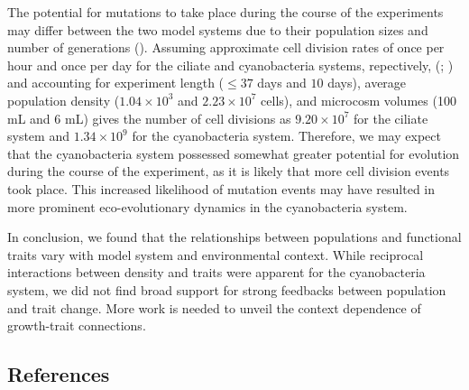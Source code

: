 \documentclass[
  letterpaper,
  DIV=11,
  numbers=noendperiod]{scrartcl}
\begin{document}
The potential for mutations to take place during the course of the
experiments may differ between the two model systems due to their
population sizes and number of generations
(). Assuming
approximate cell division rates of once per hour and once per day for
the ciliate and cyanobacteria systems, repectively,
(;
) and accounting for
experiment length (\(\leq 37\) days and \(10\) days), average population
density (\(1.04 \times 10^{3}\) and \(2.23 \times 10^{7}\) cells), and
microcosm volumes (100 mL and 6 mL) gives the number of cell divisions
as \(9.20 \times 10^{7}\) for the ciliate system and
\(1.34 \times 10^{9}\) for the cyanobacteria system. Therefore, we may
expect that the cyanobacteria system possessed somewhat greater
potential for evolution during the course of the experiment, as it is
likely that more cell division events took place. This increased
likelihood of mutation events may have resulted in more prominent
eco-evolutionary dynamics in the cyanobacteria system.

In conclusion, we found that the relationships between populations and
functional traits vary with model system and environmental context.
While reciprocal interactions between density and traits were apparent
for the cyanobacteria system, we did not find broad support for strong
feedbacks between population and trait change. More work is needed to
unveil the context dependence of growth-trait connections.

\subsection{References}\label{references}
\end{document}
